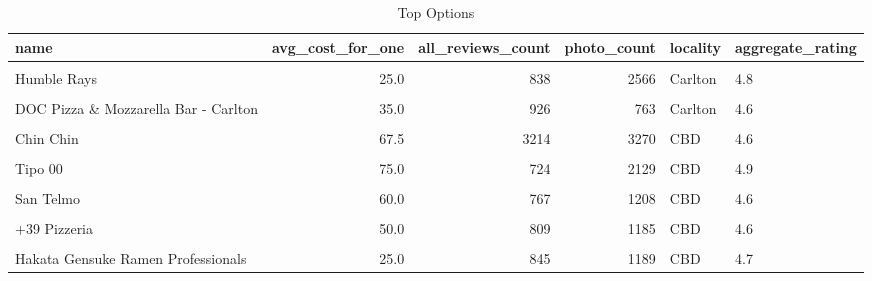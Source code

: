 \documentclass[11pt,a4paper,]{article}
\begin{document}
\begin{table}[!h]

\caption{\label{tab:rest-gluten-free}Top Options}
\centering
\fontsize{8}{10}\selectfont
\begin{tabular}[t]{l|r|r|r|l|l}
\hline
name & avg\_cost\_for\_one & all\_reviews\_count & photo\_count & locality & aggregate\_rating\\
\hline
\cellcolor{gray!6}{Jinda Thai Restaurant} & \cellcolor{gray!6}{40.0} & \cellcolor{gray!6}{1036} & \cellcolor{gray!6}{2477} & \cellcolor{gray!6}{Abbotsford} & \cellcolor{gray!6}{4.7}\\
\hline
Humble Rays & 25.0 & 838 & 2566 & Carlton & 4.8\\
\hline
\cellcolor{gray!6}{Vertue Coffee Roasters} & \cellcolor{gray!6}{25.0} & \cellcolor{gray!6}{465} & \cellcolor{gray!6}{1424} & \cellcolor{gray!6}{Carlton} & \cellcolor{gray!6}{4.6}\\
\hline
DOC Pizza \& Mozzarella Bar - Carlton & 35.0 & 926 & 763 & Carlton & 4.6\\
\hline
\cellcolor{gray!6}{The Hardware Societe} & \cellcolor{gray!6}{30.0} & \cellcolor{gray!6}{2108} & \cellcolor{gray!6}{4230} & \cellcolor{gray!6}{CBD} & \cellcolor{gray!6}{4.6}\\
\hline
Chin Chin & 67.5 & 3214 & 3270 & CBD & 4.6\\
\hline
\cellcolor{gray!6}{Dodee Paidang} & \cellcolor{gray!6}{37.5} & \cellcolor{gray!6}{483} & \cellcolor{gray!6}{1007} & \cellcolor{gray!6}{CBD} & \cellcolor{gray!6}{4.6}\\
\hline
Tipo 00 & 75.0 & 724 & 2129 & CBD & 4.9\\
\hline
\cellcolor{gray!6}{Rice Paper Scissors} & \cellcolor{gray!6}{40.0} & \cellcolor{gray!6}{992} & \cellcolor{gray!6}{2884} & \cellcolor{gray!6}{CBD} & \cellcolor{gray!6}{4.8}\\
\hline
San Telmo & 60.0 & 767 & 1208 & CBD & 4.6\\
\hline
\cellcolor{gray!6}{MoVida Bar De Tapas} & \cellcolor{gray!6}{60.0} & \cellcolor{gray!6}{900} & \cellcolor{gray!6}{1160} & \cellcolor{gray!6}{CBD} & \cellcolor{gray!6}{4.7}\\
\hline
+39 Pizzeria & 50.0 & 809 & 1185 & CBD & 4.6\\
\hline
\cellcolor{gray!6}{Cumulus Inc.} & \cellcolor{gray!6}{75.0} & \cellcolor{gray!6}{1125} & \cellcolor{gray!6}{1288} & \cellcolor{gray!6}{CBD} & \cellcolor{gray!6}{4.7}\\
\hline
Hakata Gensuke Ramen Professionals & 25.0 & 845 & 1189 & CBD & 4.7\\

\end{tabular}
\end{table}
\end{document}
